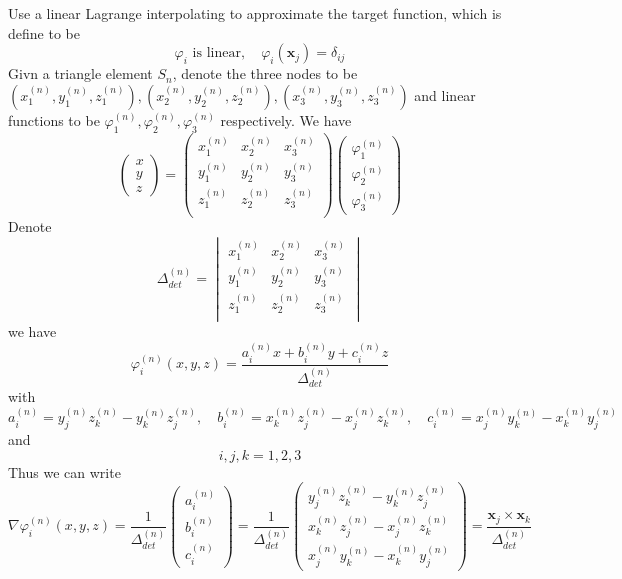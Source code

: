 \documentclass[a4paper]{article}
\renewcommand{\vec}[1]{\mathbf{#1}}
\begin{document}
Use a linear Lagrange interpolating to approximate the target function,
which is define to be
\[
    \varphi_i \text{ is linear},\quad
    \varphi_i(\vec{x}_j)=\delta_{ij}
\]
Givn a triangle element \(S_n\), denote the three nodes to be $(x_1^{(n)},y_1^{(n)},z_1^{(n)}),(x_2^{(n)},y_2^{(n)},z_2^{(n)}),(x_3^{(n)},y_3^{(n)},z_3^{(n)})$
and linear functions to be $\varphi_1^{(n)},\varphi_2^{(n)},\varphi_3^{(n)}$ respectively. We have
\[
\begin{pmatrix}
    x\\y\\z
\end{pmatrix}    
=\begin{pmatrix}
    x_1^{(n)} & x_2^{(n)} & x_3^{(n)}\\
    y_1^{(n)} & y_2^{(n)} & y_3^{(n)}\\
    z_1^{(n)} & z_2^{(n)} & z_3^{(n)}\\
\end{pmatrix}
\begin{pmatrix}
    \varphi_1^{(n)}\\\varphi_2^{(n)}\\\varphi_3^{(n)}
\end{pmatrix}
\]
Denote 
\[
    \Delta_{det}^{(n)}= 
    \begin{vmatrix}
        x_1^{(n)} & x_2^{(n)} & x_3^{(n)}\\
        y_1^{(n)} & y_2^{(n)} & y_3^{(n)}\\
        z_1^{(n)} & z_2^{(n)} & z_3^{(n)}\\
    \end{vmatrix}
\]
we have 
\[
\varphi_i^{(n)}(x,y,z)=\frac{a_i^{(n)} x+b_i^{(n)} y+c_i^{(n)} z}{\Delta_{det}^{(n)}}
\]
with \[
a_i^{(n)}=y_j^{(n)} z_k^{(n)}-y_k^{(n)} z_j^{(n)},\quad b_i^{(n)}=x_k^{(n)} z_j^{(n)}-x_j^{(n)} z_k^{(n)},\quad c_i^{(n)}=x_j^{(n)} y_k^{(n)}-x_k^{(n)} y_j^{(n)}    
\]
and 
\[
    i,j,k=1,2,3
    \]
Thus we can write\[
   \nabla \varphi_i^{(n)}(x,y,z)= \frac{1}{\Delta_{det}^{(n)}}\begin{pmatrix}
    a_i^{(n)} \\ b_i^{(n)}  \\ c_i^{(n)} 
    \end{pmatrix}
    =\frac{1}{\Delta_{det}^{(n)}}
    \begin{pmatrix}
        y_j^{(n)} z_k^{(n)}-y_k^{(n)} z_j^{(n)} \\ 
        x_k^{(n)} z_j^{(n)}-x_j^{(n)} z_k^{(n)}  \\ 
        x_j^{(n)} y_k^{(n)}-x_k^{(n)} y_j^{(n)} 
   \end{pmatrix}
   =\frac{\vec{x}_j\times \vec{x}_k}{\Delta_{det}^{(n)}} 
\]
\end{document}
